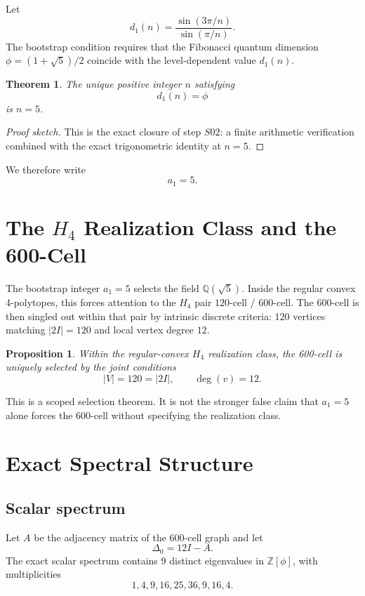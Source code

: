 \documentclass[12pt,a4paper]{article}
\newtheorem{theorem}{Theorem}
\newtheorem{proposition}{Proposition}
\theoremstyle{definition}
\begin{document}
Let
\[
d_1(n)=\frac{\sin(3\pi/n)}{\sin(\pi/n)}.
\]
The bootstrap condition requires that the Fibonacci quantum dimension
\(\phi=(1+\sqrt{5})/2\) coincide with the level-dependent value \(d_1(n)\).

\begin{theorem}
The unique positive integer \(n\) satisfying
\[
d_1(n)=\phi
\]
is \(n=5\).
\end{theorem}

\begin{proof}[Proof sketch]
This is the exact closure of step \(S02\): a finite arithmetic verification
combined with the exact trigonometric identity at \(n=5\).
\end{proof}

We therefore write
\[
a_1=5.
\]

\section{The \(H_4\) Realization Class and the 600-Cell}

The bootstrap integer \(a_1=5\) selects the field \(\mathbb{Q}(\sqrt{5})\).
Inside the regular convex 4-polytopes, this forces attention to the \(H_4\)
pair \(120\)-cell / \(600\)-cell. The 600-cell is then singled out within that
pair by intrinsic discrete criteria: \(120\) vertices matching \(|2I|=120\)
and local vertex degree \(12\).

\begin{proposition}
Within the regular-convex \(H_4\) realization class, the 600-cell is uniquely
selected by the joint conditions
\[
|V|=120=|2I|,
\qquad
\deg(v)=12.
\]
\end{proposition}

This is a scoped selection theorem. It is not the stronger false claim that
\(a_1=5\) alone forces the 600-cell without specifying the realization class.

\section{Exact Spectral Structure}

\subsection{Scalar spectrum}

Let \(A\) be the adjacency matrix of the 600-cell graph and let
\[
\Delta_0 = 12I - A.
\]
The exact scalar spectrum contains 9 distinct eigenvalues in \(\mathbb{Z}[\phi]\),
with multiplicities
\[
1,4,9,16,25,36,9,16,4.
\]
\end{document}
